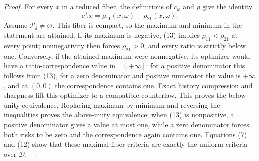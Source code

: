 \documentclass{article}
\begin{document}
\begin{proof}
For every \(x\) in a reduced fiber, the definitions of \(c_\omega\) and \(\rho\) give the identity
\[
 c_\omega^{\top}x
 =\rho_{11}(x,\omega)-\rho_{21}(x,\omega).
\tag{13}
\]
Assume \(\mathcal P_{\bar\delta}\neq\varnothing\).  This fiber is compact, so the maximum and minimum in the statement are attained.  If its maximum is negative, (13) implies \(\rho_{11}<\rho_{21}\) at every point; nonnegativity then forces \(\rho_{21}>0\), and every ratio is strictly below one.  Conversely, if the attained maximum were nonnegative, its optimizer would have a ratio-correspondence value in \([1,+\infty]\): for a positive denominator this follows from (13), for a zero denominator and positive numerator the value is \(+\infty\), and at \((0,0)\) the correspondence contains one.  Exact history compression and sharpness lift this optimizer to a compatible counterlaw.  This proves the below-unity equivalence.  Replacing maximum by minimum and reversing the inequalities proves the above-unity equivalence; when (13) is nonpositive, a positive denominator gives a value at most one, while a zero denominator forces both risks to be zero and the correspondence again contains one.  Equations (7) and (12) show that these maximal-fiber criteria are exactly the uniform criteria over \(\mathcal D\).


\end{proof}
\end{document}
